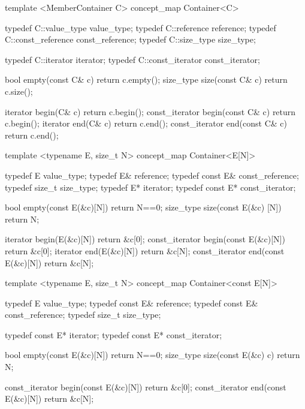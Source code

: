 \documentclass[american,twoside]{book}
\begin{document}
\pnum
{}


\begin{itemdecl}
template <MemberContainer C>
concept_map Container<C> {
  typedef C::value_type      value_type;
  typedef C::reference       reference;
  typedef C::const_reference const_reference;
  typedef C::size_type       size_type;

  typedef C::iterator        iterator;
  typedef C::const_iterator  const_iterator;

  bool           empty(const C& c) { return c.empty(); }
  size_type      size(const C& c)  { return c.size(); }

  iterator       begin(C& c)       { return c.begin(); }
  const_iterator begin(const C& c) { return c.begin(); }
  iterator       end(C& c)         { return c.end(); }
  const_iterator end(const C& c)   { return c.end(); }
}
\end{itemdecl}

\begin{itemdescr}
\pnum 
{}
\end{itemdescr}

\begin{itemdecl}
template <typename E, size_t N>
concept_map Container<E[N]> {
  typedef E                  value_type;
  typedef E&                 reference;
  typedef const E&           const_reference;
  typedef size_t             size_type;
  typedef E*                 iterator;
  typedef const E*           const_iterator;

  bool           empty(const E(&c)[N]) { return N==0; }
  size_type      size(const E(&c) [N]) { return N; }

  iterator       begin(E(&c)[N])       { return &c[0]; }
  const_iterator begin(const E(&c)[N]) { return &c[0]; }
  iterator       end(E(&c)[N])         { return &c[N]; }  
  const_iterator end(const E(&c)[N])   { return &c[N]; }
}
\end{itemdecl}

\begin{itemdecl}
template <typename E, size_t N>
concept_map Container<const E[N]> {
  typedef E                  value_type;
  typedef const E&           reference;
  typedef const E&           const_reference;
  typedef size_t             size_type;

  typedef const E*           iterator;
  typedef const E*           const_iterator;

  bool           empty(const E(&c)[N]) { return N==0; }
  size_type      size(const E(&c) c)   { return N; }

  const_iterator begin(const E(&c)[N]) { return &c[0]; }
  const_iterator end(const E(&c)[N])   { return &c[N]; }
}
\end{itemdecl}
\end{document}
